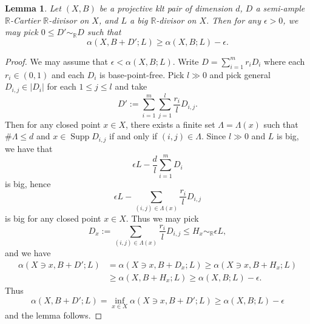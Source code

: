 \documentclass[11pt,reqno]{amsart}
\numberwithin{equation}{section}
\newcommand{\Supp}{\operatorname{Supp}}
\newtheorem{lem}[thm]{Lemma}
\theoremstyle{definition}
\begin{document}
\begin{lem}\label{lem: alpha bound}
  Let $(X,B)$ be a projective klt pair of dimension $d$, $D$ a semi-ample $\mathbb R$-Cartier $\mathbb R$-divisor on $X$, and $L$ a big $\mathbb R$-divisor on $X$. Then for any $\epsilon>0$, we may pick $0\leq D'\sim_{\mathbb R}D$ such that
  $$\alpha(X,B+D';L)\geq \alpha(X,B;L)-\epsilon.$$
\end{lem}
\begin{proof}
We may assume that $\epsilon<\alpha(X,B;L)$. Write $D=\sum_{i=1}^mr_iD_i$ where each $r_i\in (0,1)$ and each $D_i$ is base-point-free. Pick $l\gg 0$ and pick general $D_{i,j}\in |D_i|$ for each $1\leq j\leq l$ and take
$$D':=\sum_{i=1}^m\sum_{j=1}^l\frac{r_i}{l}D_{i,j}.$$
Then for any closed point $x\in X$, there exists a finite set $\Lambda=\Lambda(x)$ such that $\#\Lambda\leq d$ and $x\in\Supp D_{i,j}$ if and only if $(i,j)\in\Lambda$. Since $l\gg 0$ and $L$ is big, we have that
$$\epsilon L-\frac{d}{l}\sum_{i=1}^mD_i$$
is big, hence
$$\epsilon L-\sum_{(i,j)\in\Lambda(x)}\frac{r_i}{l}D_{i,j}$$
is big for any closed point $x\in X$. Thus we may pick
$$D_x:=\sum_{(i,j)\in\Lambda(x)}\frac{r_i}{l}D_{i,j}\leq H_x\sim_{\mathbb R}\epsilon L,$$
and we have
\begin{align*}
  \alpha(X\ni x,B+D';L)&=\alpha(X\ni x,B+D_x;L)\geq\alpha(X\ni x,B+H_x;L)\\
  &\geq \alpha(X,B+H_x;L)\geq \alpha(X,B;L)-\epsilon.
\end{align*}
Thus
$$\alpha(X,B+D';L)=\inf_{x\in X}\alpha(X\ni x,B+D';L)\geq\alpha(X,B;L)-\epsilon$$
and the lemma follows.
\end{proof}
\end{document}
